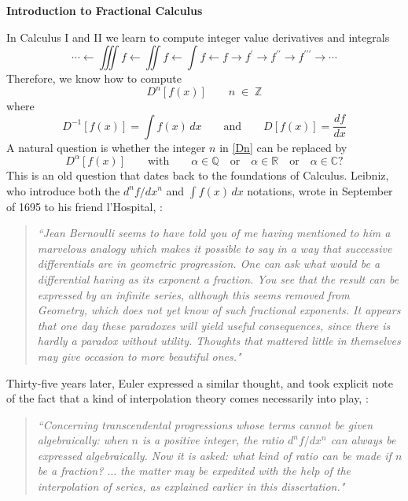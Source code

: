 \documentclass[12pt]{article}
\theoremstyle{definition}
\begin{document}

\begin{center}
{\bf {\Large Introduction to Fractional Calculus}}\\[1cm]
\end{center}

In Calculus I and II we learn to compute integer value derivatives and integrals
\[
\cdots \longleftarrow \iiint f \longleftarrow \iint f \longleftarrow \int f \longleftarrow f \longrightarrow f^\prime \longrightarrow f^{\prime\prime} \longrightarrow f^{\prime\prime\prime} \longrightarrow \cdots
\]
Therefore, we know how to compute
%
\begin{equation}\label{Dn}
D^n[f(x)]\qquad n\;\in\; \mathbb{Z}
\end{equation}
%
where 
\[
D^{-1}[f(x)] = \int f(x)\, dx\qquad \text{and}\qquad D[f(x)] = \frac{df}{dx}
\]
A natural question is whether the integer $n$ in \eqref{Dn} can be replaced by
\[
D^\alpha[f(x)]\qquad\text{with}\qquad \alpha \in \mathbb{Q}\quad\text{or}\quad \alpha \in \mathbb{R}\quad\text{or}\quad \alpha \in \mathbb{C}?
\]
This is an old question that dates back to the foundations of Calculus.  Leibniz, who introduce both the $d^nf/dx^n$ and $\int f(x)\, dx$ notations, wrote in September of 1695 to his friend l'Hospital, \cite[p.\ 299]{M-1977}:
\begin{quote}
{\it ``Jean Bernoulli seems to have told you of me having mentioned to
him a marvelous analogy which makes it possible to say in
a way that successive differentials are in geometric progression.
One can ask what would be a differential having as its exponent
a fraction. You see that the result can be expressed by an infinite
series, although this seems removed from Geometry, which does not
yet know of such fractional exponents. It appears that one day these
paradoxes will yield useful consequences, since there is hardly a
paradox without utility. Thoughts that mattered little in themselves
may give occasion to more beautiful ones."}
\end{quote}
Thirty-five years later, Euler expressed a similar thought, and took explicit note of the fact that a kind of interpolation theory comes necessarily into play, \cite{W-1997}:
\begin{quote}
{\it ``Concerning transcendental progressions whose terms cannot be
given algebraically: when $n$ is a positive integer, the ratio $d^nf/dx^n$
can always be expressed algebraically. Now it is asked: what kind of ratio can be made if $n$ be a fraction? $\ldots$ the matter may be expedited
with the help of the interpolation of series, as explained earlier in
this dissertation."}
\end{quote}
\end{document}
